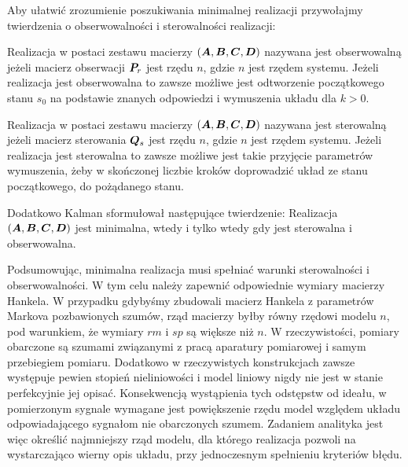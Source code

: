 Aby ułatwić zrozumienie poszukiwania minimalnej realizacji przywołajmy twierdzenia o obserwowalności i sterowalności realizacji:
\begin{theorem}[O obserwowalności]
Realizacja w postaci zestawu macierzy $(\bm{A},\bm{B},\bm{C},\bm{D})$ nazywana jest obserwowalną jeżeli macierz obserwacji $\bm{P}_r$ jest rzędu $n$, gdzie $n$ jest rzędem systemu. Jeżeli realizacja jest obserwowalna to zawsze możliwe jest odtworzenie początkowego stanu $s_0$ na podstawie znanych odpowiedzi i wymuszenia układu dla $k>0$.
\end{theorem}
\begin{theorem}[O sterowalności]
Realizacja w postaci zestawu macierzy $(\bm{A},\bm{B},\bm{C},\bm{D})$ nazywana jest sterowalną jeżeli macierz sterowania $\bm{Q}_s$ jest rzędu $n$, gdzie $n$ jest rzędem systemu. Jeżeli realizacja jest sterowalna to zawsze możliwe jest takie przyjęcie parametrów wymuszenia, żeby w skończonej liczbie kroków doprowadzić układ ze stanu początkowego, do pożądanego stanu.
\end{theorem}

Dodatkowo Kalman sformułował następujące twierdzenie: Realizacja $(\bm{A},\bm{B},\bm{C},\bm{D})$ jest minimalna, wtedy i tylko wtedy gdy jest sterowalna i obserwowalna.

Podsumowując, minimalna realizacja musi spełniać warunki sterowalności i obserwowalności. W tym celu należy zapewnić odpowiednie wymiary macierzy Hankela. W przypadku gdybyśmy zbudowali macierz Hankela z parametrów Markova pozbawionych szumów, rząd macierzy byłby równy rzędowi modelu $n$, pod warunkiem, że wymiary $rm$ i $sp$ są większe niż $n$. W rzeczywistości, pomiary obarczone są szumami związanymi z pracą aparatury pomiarowej i samym przebiegiem pomiaru. Dodatkowo w rzeczywistych konstrukcjach zawsze występuje pewien stopień nieliniowości i model liniowy nigdy nie jest w stanie perfekcyjnie jej opisać. Konsekwencją wystąpienia tych odstępstw od ideału, w pomierzonym sygnale wymagane jest powiększenie rzędu model względem układu odpowiadającego sygnałom nie obarczonych szumem. Zadaniem analityka jest więc określić najmniejszy rząd modelu, dla którego realizacja pozwoli na wystarczająco wierny opis układu, przy jednoczesnym spełnieniu kryteriów błędu.

